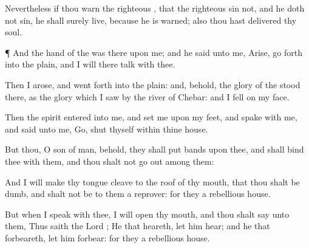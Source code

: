 {Nevertheless if thou
warn the
righteous
{}, that the
righteous
sin not, and he doth not
sin, he shall
surely
live, because he is
warned; also thou hast
delivered thy
soul.


\par }{\PP {}¶ And the
hand of the
{} was there upon me; and he
said unto me,
Arise, go
forth into the
plain, and I will there
talk with thee.

Then I
arose, and went
forth into the
plain: and, behold, the
glory of the
{}
stood there, as the
glory which I
saw by the
river of
Chebar: and I
fell on my
face.

Then the
spirit
entered into me, and
set me upon my
feet, and
spake with me, and
said unto me,
Go,
shut thyself
within thine
house.

But thou, O
son of
man, behold, they shall
put
bands upon thee, and shall
bind thee with them, and thou shalt not go
out
among them:

And I will make thy
tongue
cleave to the roof of thy
mouth, that thou shalt be
dumb, and shalt not be to them a
reprover: for they
{} a
rebellious
house.

But when I
speak
with thee, I will
open thy
mouth, and thou shalt
say unto them, Thus
saith the
Lord
{}; He that
heareth, let him
hear; and he that
forbeareth, let him
forbear: for they
{} a
rebellious
house.




\par }
